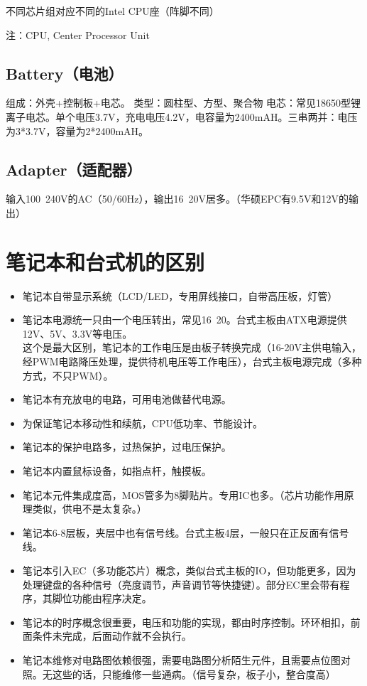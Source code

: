 不同芯片组对应不同的Intel CPU座（阵脚不同）

注：CPU, Center Processor Unit

\subsection{Battery（电池）}
组成：外壳+控制板+电芯。
类型：圆柱型、方型、聚合物
电芯：常见18650型锂离子电芯。单个电压3.7V，充电电压4.2V，电容量为2400mAH。三串两并：电压为3*3.7V，容量为2*2400mAH。

\subsection{Adapter（适配器）}
输入100~240V的AC（50/60Hz），输出16~20V居多。（华硕EPC有9.5V和12V的输出）

\section{笔记本和台式机的区别}
\begin{itemize}
    \item 笔记本自带显示系统（LCD/LED，专用屏线接口，自带高压板，灯管）
    \item 笔记本电源统一只由一个电压转出，常见16~20。台式主板由ATX电源提供12V、5V、3.3V等电压。\\这个是最大区别，笔记本的工作电压是由板子转换完成（16-20V主供电输入，经PWM电路降压处理，提供待机电压等工作电压），台式主板电源完成（多种方式，不只PWM）。
    \item 笔记本有充放电的电路，可用电池做替代电源。
    \item 为保证笔记本移动性和续航，CPU低功率、节能设计。
    \item 笔记本的保护电路多，过热保护，过电压保护。
    \item 笔记本内置鼠标设备，如指点杆，触摸板。
    \item 笔记本元件集成度高，MOS管多为8脚贴片。专用IC也多。（芯片功能作用原理类似，供电不是太复杂。）
    \item 笔记本6-8层板，夹层中也有信号线。台式主板4层，一般只在正反面有信号线。
    \item 笔记本引入EC（多功能芯片）概念，类似台式主板的IO，但功能更多，因为处理键盘的各种信号（亮度调节，声音调节等快捷键）。部分EC里会带有程序，其脚位功能由程序决定。
    \item 笔记本的时序概念很重要，电压和功能的实现，都由时序控制。环环相扣，前面条件未完成，后面动作就不会执行。
    \item 笔记本维修对电路图依赖很强，需要电路图分析陌生元件，且需要点位图对照。无这些的话，只能维修一些通病。（信号复杂，板子小，整合度高）
\end{itemize}

